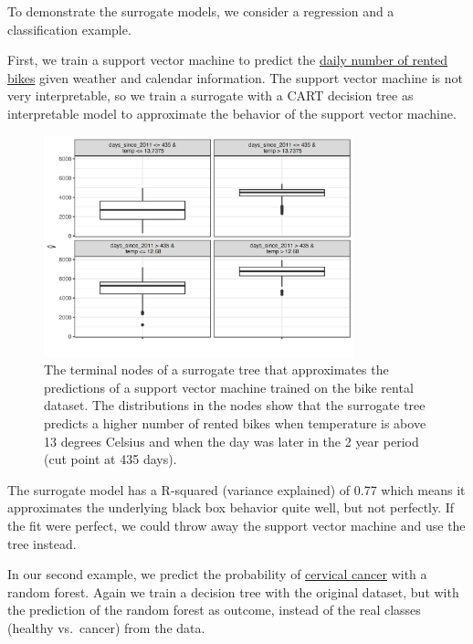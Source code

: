\documentclass[
  10pt,
]{scrbook}
\begin{document}
To demonstrate the surrogate models, we consider a regression and a classification example.

First, we train a support vector machine to predict the \protect\hyperlink{bike-data}{daily number of rented bikes} given weather and calendar information.
The support vector machine is not very interpretable, so we train a surrogate with a CART decision tree as interpretable model to approximate the behavior of the support vector machine.

\begin{figure}

{\centering \includegraphics[width=0.8\textwidth]{images/surrogate-bike-1} 

}

\caption{The terminal nodes of a surrogate tree that approximates the predictions of a support vector machine trained on the bike rental dataset. The distributions in the nodes show that the surrogate tree predicts a higher number of rented bikes when temperature is above 13 degrees Celsius and when the day was later in the 2 year period (cut point at 435 days).}\label{fig:surrogate-bike}
\end{figure}

The surrogate model has a R-squared (variance explained) of 0.77 which means it approximates the underlying black box behavior quite well, but not perfectly.
If the fit were perfect, we could throw away the support vector machine and use the tree instead.

In our second example, we predict the probability of \protect\hyperlink{cervical}{cervical cancer} with a random forest.
Again we train a decision tree with the original dataset, but with the prediction of the random forest as outcome, instead of the real classes (healthy vs.~cancer) from the data.
\end{document}
